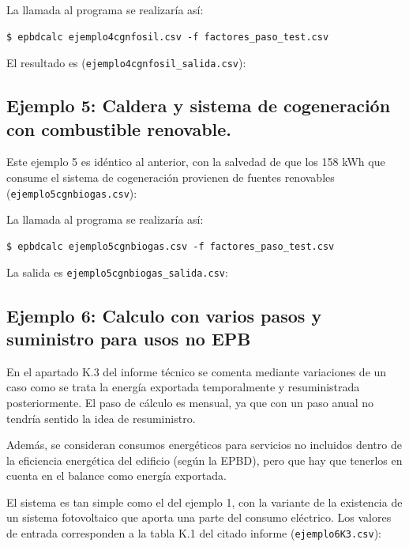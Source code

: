 \documentclass[10pt,notitlepage,oneside,a4paper]{article}
\begin{document}
La llamada al programa se realizaría así:

\begin{Verbatim}[fontsize=\small]
    $ epbdcalc ejemplo4cgnfosil.csv -f factores_paso_test.csv
\end{Verbatim}

El resultado es (\texttt{ejemplo4cgnfosil\_salida.csv}):


\subsection{Ejemplo 5: Caldera y sistema de cogeneración con combustible renovable.}
Este ejemplo 5 es idéntico al anterior, con la salvedad de que los 158 kWh que consume el sistema de cogeneración provienen de fuentes renovables (\texttt{ejemplo5cgnbiogas.csv}):


La llamada al programa se realizaría así:

\begin{Verbatim}[fontsize=\small]
    $ epbdcalc ejemplo5cgnbiogas.csv -f factores_paso_test.csv
\end{Verbatim}

La salida es \texttt{ejemplo5cgnbiogas\_salida.csv}:



\subsection{Ejemplo 6: Calculo con varios pasos y suministro para usos no EPB}
En el apartado K.3 del informe técnico se comenta mediante variaciones de un caso como se trata la energía exportada temporalmente y resuministrada posteriormente. El paso de cálculo es mensual, ya que con un paso anual no tendría sentido la idea de resuministro.

Además, se consideran consumos energéticos para servicios no incluidos dentro de la eficiencia energética del edificio (según la EPBD), pero que hay que tenerlos en cuenta en el balance como energía exportada. 

El sistema es tan simple como el del ejemplo 1, con la variante de la existencia de un sistema fotovoltaico que aporta una parte del consumo eléctrico. Los valores de entrada corresponden a la tabla K.1 del citado informe (\texttt{ejemplo6K3.csv}):
\end{document}
